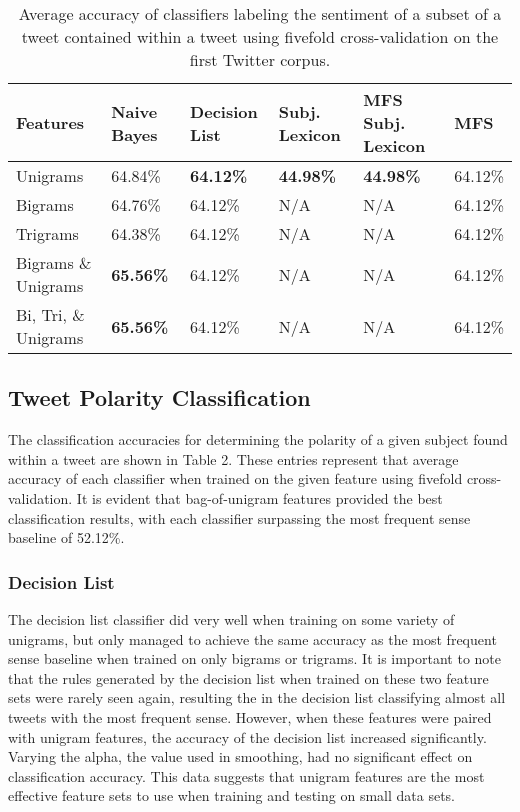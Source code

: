 \documentclass[11pt]{article}
\begin{document}
\begin{table*}[htp!]
  \centering
  \begin{tabular}{| l || l | l | l | l| l |}
  \hline
  Features & Naive Bayes & Decision List & Subj. Lexicon & MFS Subj. Lexicon & MFS \\ 
  \hline \hline
  Unigrams              & 64.84\%      & \bf{64.12\%} & \bf{44.98\%} & \bf{44.98\%} & 64.12\% \\  \hline
  Bigrams               & 64.76\%      & 64.12\%      & N/A          & N/A          & 64.12\% \\  \hline
  Trigrams              & 64.38\%      & 64.12\%      & N/A          & N/A          & 64.12\% \\  \hline
  Bigrams \& Unigrams   & \bf{65.56\%} & 64.12\%      & N/A          & N/A          & 64.12\% \\  \hline
  Bi, Tri, \& Unigrams  & \bf{65.56\%} & 64.12\%      & N/A          & N/A          & 64.12\% \\  \hline  
  \end{tabular}
  \caption{Average accuracy of classifiers labeling the sentiment of a subset of a tweet contained within a tweet using fivefold cross-validation on the first Twitter corpus.}
\end{table*}

\subsection{Tweet Polarity Classification}
The classification accuracies for determining the polarity of a given subject found within a tweet are shown in Table 2. These entries represent that average accuracy of each classifier when trained on the given feature using fivefold cross-validation. It is evident that bag-of-unigram features provided the best classification results, with each classifier surpassing the most frequent sense baseline of 52.12\%.

\subsubsection*{Decision List}
The decision list classifier did very well when training on some variety of unigrams, but only managed to achieve the same accuracy as the most frequent sense baseline when trained on only bigrams or trigrams. It is important to note that the rules generated by the decision list when trained on these two feature sets were rarely seen again, resulting the in the decision list classifying almost all tweets with the most frequent sense. However, when these features were paired with unigram features, the accuracy of the decision list increased significantly. Varying the alpha, the value used in smoothing, had no significant effect on classification accuracy. This data suggests that unigram features are the most effective feature sets to use when training and testing on small data sets.
\end{document}

